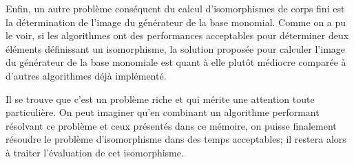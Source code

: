 \documentclass[a4paper]{article} %
\numberwithin{section}{part}
\numberwithin{equation}{section}
\begin{document}
\vspace{0.3cm}

Enfin, un autre problème conséquent du calcul d'isomorphismes de corps fini est 
la détermination de l'image du générateur de la base monomial. Comme on a pu le
voir, si les algorithmes ont des performances acceptables pour déterminer deux
éléments définissant un isomorphisme, la solution proposée pour calculer l'image
du générateur de la base monomiale est quant à elle plutôt médiocre comparée à
d'autres algorithmes déjà implémenté.\par
Il se trouve que c'est un problème riche et qui mérite une attention toute
particulière. On peut imaginer qu'en combinant un algorithme performant
résolvant ce problème et ceux présentés dans ce mémoire, on puisse finalement
résoudre le problème d'isomorphisme dans des temps acceptables; il restera alors
à traiter l'évaluation de cet isomorphisme.
\end{document}
